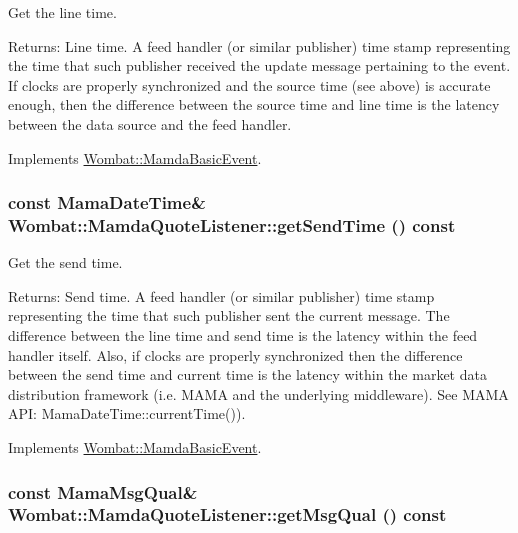 Get the line time. 

\begin{Desc}
\item[Returns:]Line time. A feed handler (or similar publisher) time stamp representing the time that such publisher received the update message pertaining to the event. If clocks are properly synchronized and the source time (see above) is accurate enough, then the difference between the source time and line time is the latency between the data source and the feed handler. \end{Desc}


Implements \hyperlink{classWombat_1_1MamdaBasicEvent_3fcc26fa1a6446bcec12b11ac74ed26d}{Wombat::Mamda\-Basic\-Event}.\hypertarget{classWombat_1_1MamdaQuoteListener_3937e363870aeca07238a7253653ee6a}{
\subsubsection[getSendTime]{\setlength{\rightskip}{0pt plus 5cm}const Mama\-Date\-Time\& Wombat::Mamda\-Quote\-Listener::get\-Send\-Time () const}}
\label{classWombat_1_1MamdaQuoteListener_3937e363870aeca07238a7253653ee6a}


Get the send time. 

\begin{Desc}
\item[Returns:]Send time. A feed handler (or similar publisher) time stamp representing the time that such publisher sent the current message. The difference between the line time and send time is the latency within the feed handler itself. Also, if clocks are properly synchronized then the difference between the send time and current time is the latency within the market data distribution framework (i.e. MAMA and the underlying middleware). See MAMA API: Mama\-Date\-Time::current\-Time()). \end{Desc}


Implements \hyperlink{classWombat_1_1MamdaBasicEvent_b0602a83bec20cd8b341ec866ff3bffa}{Wombat::Mamda\-Basic\-Event}.\hypertarget{classWombat_1_1MamdaQuoteListener_3350ee73b06ee1e205b280b070cea298}{
\subsubsection[getMsgQual]{\setlength{\rightskip}{0pt plus 5cm}const Mama\-Msg\-Qual\& Wombat::Mamda\-Quote\-Listener::get\-Msg\-Qual () const}}
\label{classWombat_1_1MamdaQuoteListener_3350ee73b06ee1e205b280b070cea298}


